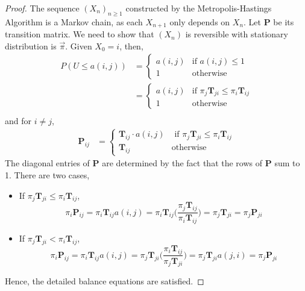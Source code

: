 \documentclass{tufte-handout}
\begin{document}
  \begin{proof}
    The sequence $(X_n)_{n \geq 1}$ constructed by the Metropolis-Hastings Algorithm is a Markov chain, as each $X_{n+1}$ only depends on $X_n$. Let \textbf{P} be its transition matrix. We need to show that $(X_n)$ is reversible with stationary distribution is $\Vec{\pi}$. Given $X_0 = i$, then,
    \begin{align*}
      P(U \leq a(i,j)) &= \begin{cases}
                          a(i,j) & \text{if $a(i,j) \leq 1$} \\
                          1 & \text{otherwise}
                          \end{cases} \\
                       &= \begin{cases}
                          a(i,j) & \text{if $\pi_j\boldsymbol{T}_{ji} \leq \pi_i\boldsymbol{T}_{ij}$} \\
                          1 & \text{otherwise}
                          \end{cases} \\
    \end{align*}
    \noindent and for $i \neq j$, 
    \begin{align*}
      \boldsymbol{P}_{ij} &= \begin{cases}
                      \boldsymbol{T}_{ij} \cdot a(i,j) & \text{ if $\pi_j\boldsymbol{T}_{ji} \leq \pi_i\boldsymbol{T}_{ij}$} \\
                      \boldsymbol{T}_{ij} & \text{otherwise}
                      \end{cases}
    \end{align*}
    \noindent The diagonal entries of \textbf{P} are determined by the fact that the rows of \textbf{P} sum to 1. There are two cases,
    \begin{itemize}
      \item If $\pi_j\boldsymbol{T}_{ji} \leq \pi_i\boldsymbol{T}_{ij}$,
      \[\pi_i\boldsymbol{P}_{ij} = \pi_i\boldsymbol{T}_{ij}a(i,j) = \pi_i\boldsymbol{T}_{ij}\bigg(\frac{\pi_j\boldsymbol{T}_{ij}}{\pi_i\boldsymbol{T}_{ij}}\bigg) = \pi_j\boldsymbol{T}_{ji} = \pi_j\boldsymbol{P}_{ji}\]
      \item If $\pi_j\boldsymbol{T}_{ji} < \pi_i\boldsymbol{T}_{ij}$,
      \[\pi_i\boldsymbol{P}_{ij} = \pi_i\boldsymbol{T}_{ij}a(i,j) = \pi_j\boldsymbol{T}_{ji}\bigg(\frac{\pi_i\boldsymbol{T}_{ij}}{\pi_j\boldsymbol{T}_{ji}}\bigg) = \pi_j\boldsymbol{T}_{ji}a(j,i) = \pi_j\boldsymbol{P}_{ji}\]
    \end{itemize}
    \noindent Hence, the detailed balance equations are satisfied.
  \end{proof}
\end{document}
